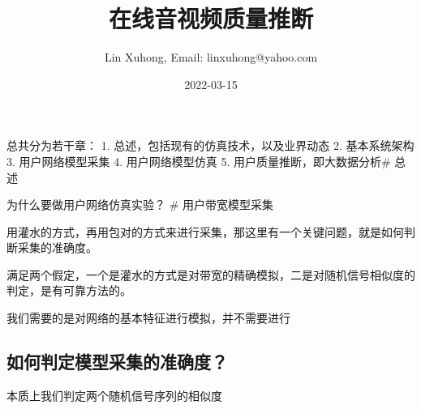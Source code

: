 \documentclass[
]{ctexbook}
\title{在线音视频质量推断}
\author{Lin Xuhong, Email: linxuhong@yahoo.com}
\date{2022-03-15}
\begin{document}
\maketitle

总共分为若干章： 1. 总述，包括现有的仿真技术，以及业界动态 2.
基本系统架构 3. 用户网络模型采集 4. 用户网络模型仿真 5.
用户质量推断，即大数据分析\# 总述

为什么要做用户网络仿真实验？ \# 用户带宽模型采集

用灌水的方式，再用包对的方式来进行采集，那这里有一个关键问题，就是如何判断采集的准确度。

满足两个假定，一个是灌水的方式是对带宽的精确模拟，二是对随机信号相似度的判定，是有可靠方法的。

我们需要的是对网络的基本特征进行模拟，并不需要进行

\hypertarget{ux5982ux4f55ux5224ux5b9aux6a21ux578bux91c7ux96c6ux7684ux51c6ux786eux5ea6}{%
\subsection{如何判定模型采集的准确度？}\label{ux5982ux4f55ux5224ux5b9aux6a21ux578bux91c7ux96c6ux7684ux51c6ux786eux5ea6}}

本质上我们判定两个随机信号序列的相似度
\end{document}
